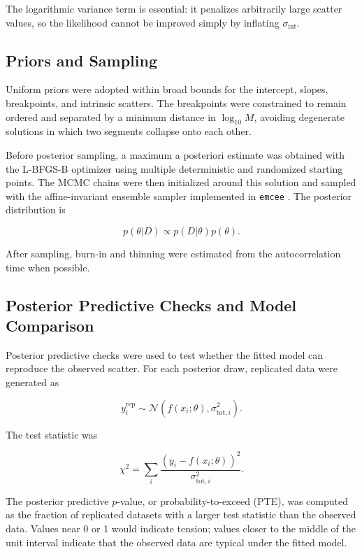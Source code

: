 \documentclass{article}
\numberwithin{equation}{section}
\begin{document}
The logarithmic variance term is essential: it penalizes arbitrarily large scatter values, so the likelihood cannot be improved simply by inflating $\sigma_{\mathrm{int}}$.

\subsection{Priors and Sampling}

Uniform priors were adopted within broad bounds for the intercept, slopes, breakpoints, and intrinsic scatters. The breakpoints were constrained to remain ordered and separated by a minimum distance in $\log_{10}M$, avoiding degenerate solutions in which two segments collapse onto each other.

Before posterior sampling, a maximum a posteriori estimate was obtained with the L-BFGS-B optimizer using multiple deterministic and randomized starting points. The MCMC chains were then initialized around this solution and sampled with the affine-invariant ensemble sampler implemented in \texttt{emcee} \cite{foremanmackey2013emcee}. The posterior distribution is

\begin{equation}
p(\theta|D) \propto p(D|\theta)p(\theta).
\end{equation}

After sampling, burn-in and thinning were estimated from the autocorrelation time when possible.

\subsection{Posterior Predictive Checks and Model Comparison}

Posterior predictive checks were used to test whether the fitted model can reproduce the observed scatter. For each posterior draw, replicated data were generated as

\begin{equation}
y_i^{\mathrm{rep}}
\sim
\mathcal{N}\left(f(x_i;\theta),\sigma_{\mathrm{tot},i}^2\right).
\end{equation}

The test statistic was

\begin{equation}
\chi^2
=
\sum_i
\frac{(y_i-f(x_i;\theta))^2}{\sigma_{\mathrm{tot},i}^2}.
\end{equation}

The posterior predictive $p$-value, or probability-to-exceed (PTE), was computed as the fraction of replicated datasets with a larger test statistic than the observed data. Values near 0 or 1 would indicate tension; values closer to the middle of the unit interval indicate that the observed data are typical under the fitted model.
\end{document}
